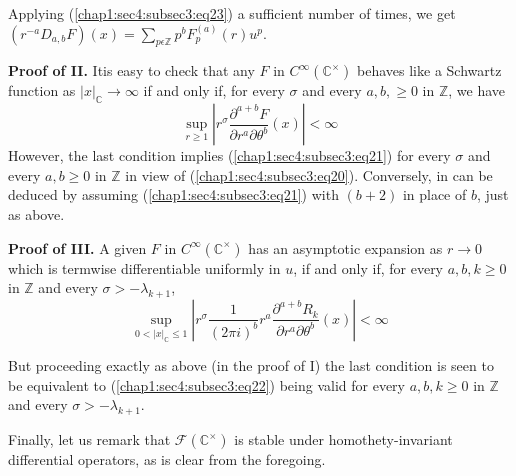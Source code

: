 Applying (\ref{chap1:sec4:subsec3:eq23}) a sufficient number of times, we get
$(r^{-a}D_{a,b}F)(x)=\sum\limits_{p\epsilon \mathbb{Z}}p^bF_{p}^{(a)}(r)u^p$.

\noindent \textbf{Proof of II.} It\pageoriginale is easy to check that any $F$ in
$C^\infty(\mathbb{C}^\times)$ behaves like a Schwartz function as
$|x|_{\mathbb{C}}\rightarrow \infty$ if and only if, for every
$\sigma$ and every $a,b,\ge 0$ in $\mathbb{Z}$, we have
\begin{equation*}
{\displaystyle{\mathop{\sup}_{r\ge
      1}}}\left|r^{\sigma}\frac{\partial^{a+b}F}{\partial
  r^{a}\partial\theta^b}(x)\right|<\infty 
\end{equation*}
 However, the last condition implies (\ref{chap1:sec4:subsec3:eq21}) for every $\sigma$ and
 every $a, b\ge 0$ in $\mathbb{Z}$ in view of
 (\ref{chap1:sec4:subsec3:eq20}). Conversely, in 
 can be deduced by assuming (\ref{chap1:sec4:subsec3:eq21}) with
 $(b+2)$ in place of $b$, just as above.

\noindent \textbf{Proof of III.} A given $F$ in
$C^\infty(\mathbb{C}^\times)$ has an 
asymptotic expansion as $r\rightarrow 0$ which is termwise
differentiable uniformly in $u$, if and only if, for every $a,b,k\ge
0$ in $\mathbb{Z}$ and every $\sigma>-\lambda_{k+1}$,
\begin{equation*}
{\displaystyle{\mathop{\sup}_{0<|x|_{\mathbb{C}}\le
      1}}}\left|r^{\sigma}\frac{1}{(2\pi
  i)^b}r^a\frac{\partial^{a+b}R_{k}}{\partial r^a \partial
  \theta^b}(x)\right|<\infty 
\end{equation*}

But proceeding exactly  as above (in the proof of I) the last
condition is seen to be equivalent to (\ref{chap1:sec4:subsec3:eq22})
being valid for every 
$a,b,k\ge 0$ in $\mathbb{Z}$ and every $\sigma > -\lambda_{k+1}$.

 Finally, let us remark that $\mathscr{F}(\mathbb{C}^\times)$ is stable
 under homothety-invari\-ant differential operators, as is clear from
 the foregoing. 

